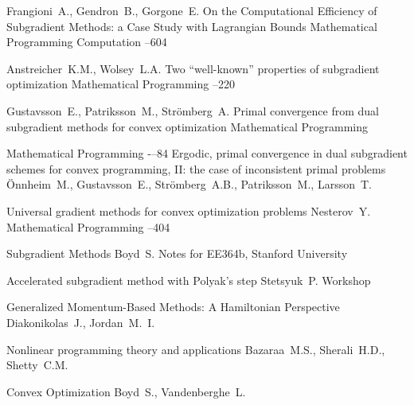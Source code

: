 \documentclass[10pt,twoside,book,a5paper]{ncc}
\begin{document}
\begin{thebibliography}{99}

\by Frangioni~A., Gendron~B., Gorgone~E.
\paper On the Computational Efficiency of Subgradient Methods: a Case Study with Lagrangian Bounds
\jour Mathematical Programming Computation
–604

\by Anstreicher~K.M., Wolsey~L.A.
\paper Two “well-known” properties of subgradient optimization
\jour Mathematical Programming
–220

\by Gustavsson~E., Patriksson~M., Strömberg~A.
\paper Primal convergence from dual subgradient methods for convex optimization
\jour Mathematical Programming

\jour Mathematical Programming
-–84
\paper Ergodic, primal convergence in dual subgradient schemes for convex programming, II: the case of inconsistent primal problems
\by Önnheim~M., Gustavsson~E., Strömberg~A.B., Patriksson~M., Larsson~T.

\paper Universal gradient methods for convex optimization problems
\by Nesterov~Y.
\jour Mathematical Programming
--404

\paper Subgradient Methods
\by Boyd~S.
\jour  Notes for EE364b, Stanford University

\paper Accelerated subgradient method with Polyak's step
\by Stetsyuk~P.
\jour Workshop

\paper Generalized Momentum-Based Methods: A Hamiltonian Perspective
\by Diakonikolas~J., Jordan~M.~I.

\paper Nonlinear programming theory and applications
\by Bazaraa~M.S., Sherali~H.D., Shetty~C.M.

\paper Convex Optimization
\by Boyd~S., Vandenberghe~L.

\end{thebibliography}

\section*{}
\end{document}
